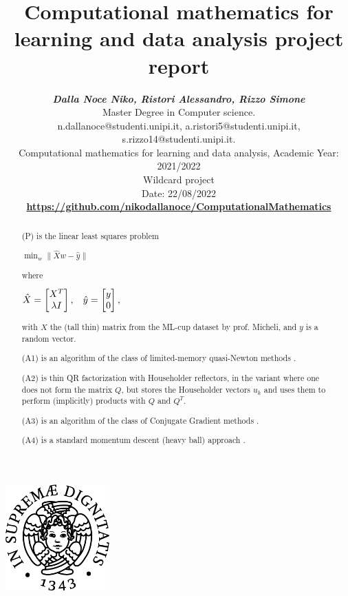 \documentclass[11pt, letterpaper]{article}  %
\title{\vspace{-2cm}\textbf{Computational mathematics for learning and data analysis project report}}
\author{\textbf{\small{\textit{Dalla Noce Niko, Ristori Alessandro, Rizzo Simone}}} \\ %
        \small{Master Degree in Computer science.}\\ \small{{n.dallanoce@studenti.unipi.it, a.ristori5@studenti.unipi.it, s.rizzo14@studenti.unipi.it}.} \\  %
        \small{Computational mathematics for learning and data analysis, Academic Year: 2021/2022} \\
        \small{Wildcard project} \\
        \small{Date: 22/08/2022} \\
       \textbf{\small{\url{https://github.com/nikodallanoce/ComputationalMathematics}}}
}
\numberwithin{equation}{section}
\begin{document}
\nocite{*}  %
\date{}
\maketitle
\begin{center}
    \includegraphics[width=0.3\textwidth]{images/unipi.png}\\
    \vspace{0.5cm}
\end{center}
\begin{abstract}
\noindent(P) is the linear least squares problem
\begin{center}
\begin{large}
$\displaystyle \min_{w} \lVert \hat{X}w-\hat{y} \rVert$
\end{large}
\end{center}
where
\begin{center}
\begin{large}
$\hat{X}= \begin{bmatrix}
    X^T\\
    \lambda I
\end{bmatrix}, \hspace{3mm}
\hat{y}= \begin{bmatrix}
    y\\
    0
\end{bmatrix},$
\end{large}
\end{center}
with $X$ the (tall thin) matrix from the ML-cup dataset by prof. Micheli, and $y$ is a random vector.
\vspace{3mm}

\noindent(A1) is an algorithm of the class of limited-memory quasi-Newton methods \cite{dauphin2014identifying}.
\vspace{3mm}

\noindent(A2) is thin QR factorization with Householder reflectors, in the variant where one does not form the matrix $Q$, but stores the Householder vectors $u_{k}$ and uses them to perform (implicitly) products with $Q$ and $Q^T$.
\vspace{3mm}

\noindent(A3) is an algorithm of the class of Conjugate Gradient methods \cite{wright1999numerical}.
\vspace{3mm}

\noindent(A4) is a standard momentum descent (heavy ball) approach \cite{sutskever2013importance}.
\end{abstract}
\end{document}
